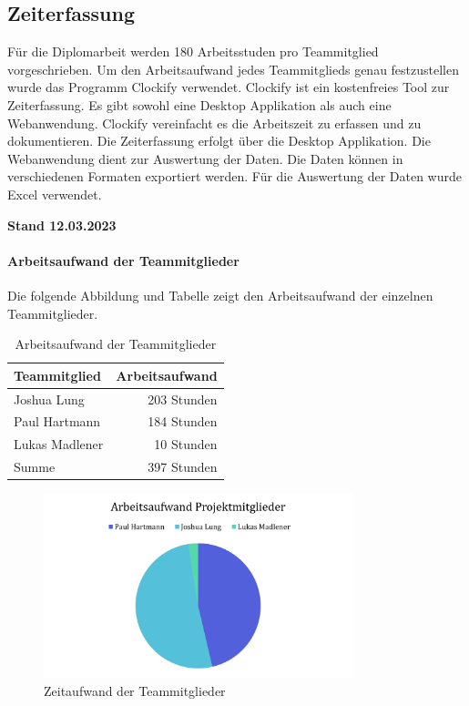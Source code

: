 \subsection{Zeiterfassung}
Für die Diplomarbeit werden 180 Arbeitsstuden pro Teammitglied vorgeschrieben. Um den Arbeitsaufwand jedes Teammitglieds genau festzustellen wurde das Programm Clockify verwendet. Clockify ist ein kostenfreies Tool zur Zeiterfassung. Es gibt sowohl eine Desktop Applikation als auch eine Webanwendung. Clockify vereinfacht es die Arbeitszeit zu erfassen und zu dokumentieren. Die Zeiterfassung erfolgt über die Desktop Applikation. Die Webanwendung dient zur Auswertung der Daten. Die Daten können in verschiedenen Formaten exportiert werden. Für die Auswertung der Daten wurde Excel verwendet.

\textbf{Stand 12.03.2023}

\paragraph{Arbeitsaufwand der Teammitglieder}
Die folgende Abbildung und Tabelle zeigt den Arbeitsaufwand der einzelnen Teammitglieder.

\begin{table}[!h]
  \centering
  \begin{tabular}{lr}
    \toprule
    \textbf{Teammitglied} & \textbf{Arbeitsaufwand} \\
    \midrule
    Joshua Lung           & 203 Stunden             \\
    Paul Hartmann         & 184 Stunden             \\
    Lukas Madlener        & 10 Stunden              \\
    \midrule
    Summe                 & 397 Stunden             \\
    \bottomrule
  \end{tabular}
  \caption{Arbeitsaufwand der Teammitglieder}
  \label{tab:zeiterfassung_teammitglieder}
\end{table}

\begin{figure}[!ht]
  \centering
  \includegraphics[width=0.8\textwidth]{images/zeiterfassung_teammitglieder.png}
  \caption{Zeitaufwand der Teammitglieder}
  \label{fig:zeiterfassung_teammitglieder}
\end{figure}


